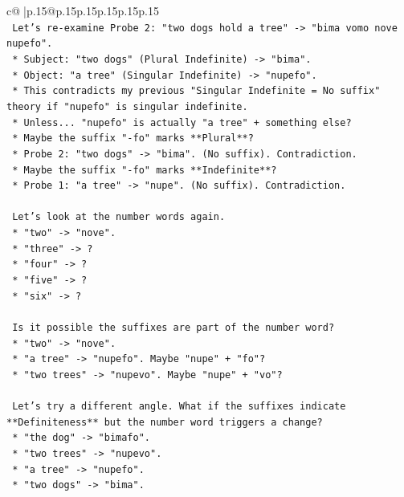 \documentclass{article}
\begin{document}
{\begin{supertabular}{c@{$\;$}|p{.15\linewidth}@{}p{.15\linewidth}p{.15\linewidth}p{.15\linewidth}p{.15\linewidth}p{.15\linewidth}}
{{{\\ 
\texttt{    Let's re{-}examine Probe 2: "two dogs hold a tree" {-}> "bima vomo nove nupefo".} \\
\texttt{    *   Subject: "two dogs" (Plural Indefinite) {-}> "bima".} \\
\texttt{    *   Object: "a tree" (Singular Indefinite) {-}> "nupefo".} \\
\texttt{    *   This contradicts my previous "Singular Indefinite = No suffix" theory if "nupefo" is singular indefinite.} \\
\texttt{    *   Unless... "nupefo" is actually "a tree" + something else?} \\
\texttt{    *   Maybe the suffix "{-}fo" marks **Plural**?} \\
\texttt{        *   Probe 2: "two dogs" {-}> "bima". (No suffix). Contradiction.} \\
\texttt{    *   Maybe the suffix "{-}fo" marks **Indefinite**?} \\
\texttt{        *   Probe 1: "a tree" {-}> "nupe". (No suffix). Contradiction.} \\
\\ 
\texttt{    Let's look at the number words again.} \\
\texttt{    *   "two" {-}> "nove".} \\
\texttt{    *   "three" {-}> ?} \\
\texttt{    *   "four" {-}> ?} \\
\texttt{    *   "five" {-}> ?} \\
\texttt{    *   "six" {-}> ?} \\
\\ 
\texttt{    Is it possible the suffixes are part of the number word?} \\
\texttt{    *   "two" {-}> "nove".} \\
\texttt{    *   "a tree" {-}> "nupefo". Maybe "nupe" + "fo"?} \\
\texttt{    *   "two trees" {-}> "nupevo". Maybe "nupe" + "vo"?} \\
\\ 
\texttt{    Let's try a different angle. What if the suffixes indicate **Definiteness** but the number word triggers a change?} \\
\texttt{    *   "the dog" {-}> "bimafo".} \\
\texttt{    *   "two trees" {-}> "nupevo".} \\
\texttt{    *   "a tree" {-}> "nupefo".} \\
\texttt{    *   "two dogs" {-}> "bima".} \\
}}}
\end{supertabular}}
\end{document}
